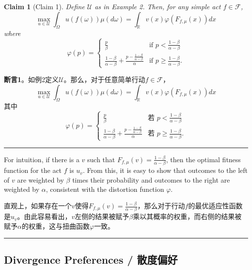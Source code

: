 \documentclass[12pt,a4paper]{article}
\newenvironment{original}
  {\par\noindent\color{black}\smallskip}
  {\par\smallskip}
\newenvironment{translation}
  {\par\noindent\color{blue!70!black}\smallskip}
  {\par\medskip\hrule\medskip}
\newtheorem{claim}[theorem]{Claim}
\begin{document}
\begin{claim}[Claim 1]
Define $\mathcal{U}$ as in Example 2. Then, for any simple act $f \in \mathcal{F}$,
\[
\max_{u \in \mathcal{U}} \int_\Omega u(f(\omega)) \mu(d\omega) = \int_\mathbb{R} v(x) \varphi(F_{f,\mu}(x)) dx
\]
where
\[
\varphi(p) = \begin{cases}
\frac{p}{\beta} & \text{if } p < \frac{1-\beta}{\alpha-\beta} \\[4pt]
\frac{1-\beta}{\alpha-\beta} + \frac{p - \frac{1-\beta}{\alpha-\beta}}{\alpha} & \text{if } p \geq \frac{1-\beta}{\alpha-\beta}.
\end{cases}
\]
\end{claim}
\begin{translation}
\textbf{断言1}。如例2定义$\mathcal{U}$。那么，对于任意简单行动$f \in \mathcal{F}$，
\[
\max_{u \in \mathcal{U}} \int_\Omega u(f(\omega)) \mu(d\omega) = \int_\mathbb{R} v(x) \varphi(F_{f,\mu}(x)) dx
\]
其中
\[
\varphi(p) = \begin{cases}
\frac{p}{\beta} & \text{若 } p < \frac{1-\beta}{\alpha-\beta} \\[4pt]
\frac{1-\beta}{\alpha-\beta} + \frac{p - \frac{1-\beta}{\alpha-\beta}}{\alpha} & \text{若 } p \geq \frac{1-\beta}{\alpha-\beta}.
\end{cases}
\]
\end{translation}

\begin{original}
For intuition, if there is a $v$ such that $F_{f,\mu}(v) = \frac{1-\beta}{\alpha-\beta}$, then the optimal fitness function for the act $f$ is $u_v$. From this, it is easy to show that outcomes to the left of $v$ are weighted by $\beta$ times their probability and outcomes to the right are weighted by $\alpha$, consistent with the distortion function $\varphi$.
\end{original}
\begin{translation}
直观上，如果存在一个$v$使得$F_{f,\mu}(v) = \frac{1-\beta}{\alpha-\beta}$，那么对于行动$f$的最优适应性函数是$u_v$。由此容易看出，$v$左侧的结果被赋予$\beta$乘以其概率的权重，而右侧的结果被赋予$\alpha$的权重，这与扭曲函数$\varphi$一致。
\end{translation}

\subsection{Divergence Preferences / 散度偏好}
\end{document}
